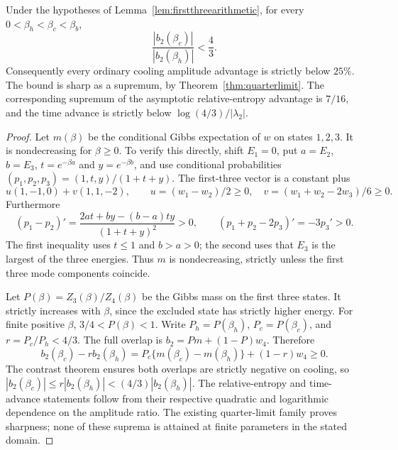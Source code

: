\begin{theorem}\label{thm:fulltripletbound}
Under the hypotheses of Lemma~\ref{lem:firstthreearithmetic}, for every
$0<\beta_h<\beta_c<\beta_b$,
\[
\frac{|b_2(\beta_c)|}{|b_2(\beta_h)|}<\frac43.
\]
Consequently every ordinary cooling amplitude advantage is strictly below
$25\%$. The bound is sharp as a supremum, by
Theorem~\ref{thm:quarterlimit}. The corresponding supremum of the
asymptotic relative-entropy advantage is $7/16$, and the time advance is
strictly below $\log(4/3)/|\lambda_2|$.
\end{theorem}
\begin{proof}
Let $m(\beta)$ be the conditional Gibbs expectation of $w$ on states
$1,2,3$. It is nondecreasing for $\beta\geq0$. To verify this directly,
shift $E_1=0$, put $a=E_2$, $b=E_3$, $t=e^{-\beta a}$ and
$y=e^{-\beta b}$, and use conditional probabilities
$(p_1,p_2,p_3)=(1,t,y)/(1+t+y)$. The first-three vector is a constant
plus
\[
u(1,-1,0)+v(1,1,-2),\qquad
u=(w_1-w_2)/2\geq0,\quad v=(w_1+w_2-2w_3)/6\geq0.
\]
Furthermore
\[
(p_1-p_2)'=\frac{2at+by-(b-a)ty}{(1+t+y)^2}>0,
\qquad (p_1+p_2-2p_3)'=-3p_3'>0.
\]
The first inequality uses $t\leq1$ and $b>a>0$; the second uses that
$E_3$ is the largest of the three energies. Thus $m$ is nondecreasing,
strictly unless the first three mode components coincide.

Let $P(\beta)=Z_3(\beta)/Z_4(\beta)$ be the Gibbs mass on the first three
states. It strictly increases with $\beta$, since the excluded state has
strictly higher energy. For finite positive $\beta$, $3/4<P(\beta)<1$.
Write $P_h=P(\beta_h)$, $P_c=P(\beta_c)$, and $r=P_c/P_h<4/3$.
The full overlap is $b_2=Pm+(1-P)w_4$. Therefore
\[
b_2(\beta_c)-r b_2(\beta_h)
=P_c\{m(\beta_c)-m(\beta_h)\}+(1-r)w_4\geq0.
\]
The contrast theorem ensures both overlaps are strictly negative on cooling,
so $|b_2(\beta_c)|\leq r|b_2(\beta_h)|<(4/3)|b_2(\beta_h)|$.
The relative-entropy and time-advance statements follow from their respective
quadratic and logarithmic dependence on the amplitude ratio. The existing
quarter-limit family proves sharpness; none of these suprema is attained at
finite parameters in the stated domain.
\end{proof}
